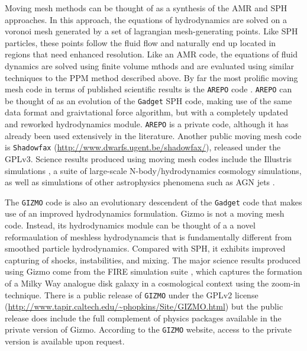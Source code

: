\documentclass[11pt,twoside]{article}
\begin{document}
Moving mesh methods can be thought of as a synthesis of the AMR and SPH approaches.  In this approach, the equations of hydrodynamics are solved on a voronoi mesh generated by a set of lagrangian mesh-generating points. Like SPH particles, these points follow the fluid flow and naturally end up located in regions that need enhanced resolution. Like an AMR code, the equations of fluid dynamics are solved using finite volume mthods and are evaluated using similar techniques to the PPM method described above. By far the most prolific moving mesh code in terms of published scientific results is the \texttt{AREPO} code \citep{springel2010}. \texttt{AREPO} can be thought of as an evolution of the \texttt{Gadget} SPH code, making use of the same data format and graivtational force algorithm, but with a completely updated and reworked hydrodynamics module. \texttt{AREPO} is a private code, although it has already been used extensively in the literature. Another public moving mesh code is \texttt{Shadowfax} \citep{vandenbroucke2016} (\url{http://www.dwarfs.ugent.be/shadowfax/}), released under the GPLv3. Science results produced using moving mesh codes include the Illustris simulations \citep{vogelsberger2014}, a suite of large-scale N-body/hydrodynamics cosmology simulations, as well as simulations of other astrophysics phenomena such as AGN jets \citep{weinberger2017}.


The \texttt{GIZMO} code \citep{hopkins2015} is also an evolutionary descendent of the \texttt{Gadget} code that makes use of an improved hydrodynamics formulation. Gizmo is not a moving mesh code. Instead, its hydrodynamics module can be thought of a a novel reformaulation of meshless hydrodynamcis that is fundamentally different from smoothed particle hydrodynamics. Compared with SPH, it exhibits improved capturing of shocks, instabilities, and mixing. The major science results produced using Gizmo come from the FIRE simulation suite \citep{hopkins2017}, which captures the formation of a Milky Way analogue disk galaxy in a cosmological context using the zoom-in technique. There is a public release of \texttt{GIZMO} under the GPLv2 license ({\small \url{http://www.tapir.caltech.edu/~phopkins/Site/GIZMO.html}}) but the public release does include the full complement of physics packages available in the private version of Gizmo. According to the \texttt{GIZMO} website, access to the private version is available upon request.
\end{document}
